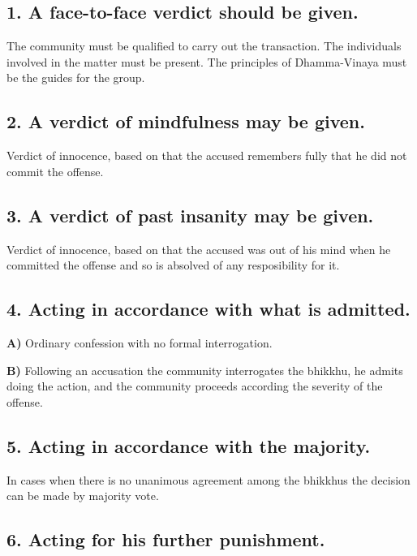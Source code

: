 \subsection{1. A face-to-face verdict should be given.}

The community must be qualified to carry out the transaction. The
individuals involved in the matter must be present. The principles of
Dhamma-Vinaya must be the guides for the group.

\subsection{2. A verdict of mindfulness may be given.}

Verdict of innocence, based on that the accused remembers fully that he
did not commit the offense.

\subsection{3. A verdict of past insanity may be given.}

Verdict of innocence, based on that the accused was out of his mind when
he committed the offense and so is absolved of any resposibility for it.

\clearpage

\subsection{4. Acting in accordance with what is admitted.}

\textbf{A)} Ordinary confession with no formal interrogation.

\textbf{B)} Following an accusation the community interrogates the
bhikkhu, he admits doing the action, and the community proceeds
according the severity of the offense.

\subsection{5. Acting in accordance with the majority.}

In cases when there is no unanimous agreement among the bhikkhus the
decision can be made by majority vote.

\subsection{6. Acting for his further punishment.}

